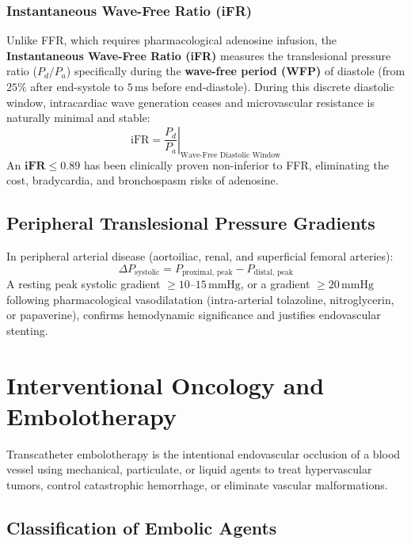 \documentclass[11pt,a4paper]{article}
\begin{document}
\subsubsection{Instantaneous Wave-Free Ratio (iFR)}
Unlike FFR, which requires pharmacological adenosine infusion, the \textbf{Instantaneous Wave-Free Ratio (iFR)} measures the translesional pressure ratio ($P_d / P_a$) specifically during the \textbf{wave-free period (WFP)} of diastole (from $25\%$ after end-systole to $5\,\text{ms}$ before end-diastole). During this discrete diastolic window, intracardiac wave generation ceases and microvascular resistance is naturally minimal and stable:
\begin{equation}
    \text{iFR} = \left. \frac{P_d}{P_a} \right|_{\text{Wave-Free Diastolic Window}}
\end{equation}
An $\mathbf{iFR \le 0.89}$ has been clinically proven non-inferior to FFR, eliminating the cost, bradycardia, and bronchospasm risks of adenosine.

\subsection{Peripheral Translesional Pressure Gradients}

In peripheral arterial disease (aortoiliac, renal, and superficial femoral arteries):
\begin{equation}
    \Delta P_{\text{systolic}} = P_{\text{proximal, peak}} - P_{\text{distal, peak}}
\end{equation}
A resting peak systolic gradient $\ge 10\text{--}15\,\text{mmHg}$, or a gradient $\ge 20\,\text{mmHg}$ following pharmacological vasodilatation (intra-arterial tolazoline, nitroglycerin, or papaverine), confirms hemodynamic significance and justifies endovascular stenting.

\newpage
\section{Interventional Oncology and Embolotherapy}

Transcatheter embolotherapy is the intentional endovascular occlusion of a blood vessel using mechanical, particulate, or liquid agents to treat hypervascular tumors, control catastrophic hemorrhage, or eliminate vascular malformations.

\subsection{Classification of Embolic Agents}
\end{document}
